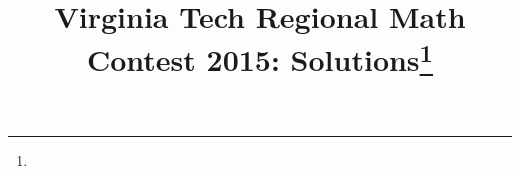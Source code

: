 \documentclass[10pt]{article}
\begin{document}
\title{Virginia Tech Regional Math Contest 2015: Solutions\footnote{\disclaimer}}
\author{\vspace{-2ex}}
\date{\vspace{-5ex}} %
\maketitle

%

%

%

%

%

%

%
\end{document}
